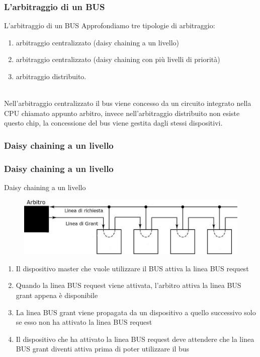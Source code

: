\begin{frame}
	\frametitle{L'arbitraggio di un BUS}
	  
	\begin{block}{L'arbitraggio di un BUS}
		Approfondiamo tre tipologie di arbitraggio:
		\begin{enumerate}
			\item arbitraggio centralizzato (daisy chaining a un livello)
			\item arbitraggio centralizzato (daisy chaining con più livelli di priorità)
			\item arbitraggio distribuito.
		\end{enumerate}
		~\\
		Nell'arbitraggio centralizzato il bus viene concesso da un circuito integrato nella CPU chiamato appunto arbitro, invece nell'arbitraggio distribuito non esiste questo chip, la concessione del bus viene gestita dagli stessi dispositivi.

	\end{block}
\end{frame}



\subsubsection[Daisy chaining a un livello]{Daisy chaining a un livello}
\begin{frame}
	\frametitle{Daisy chaining a un livello}
	  
	\begin{block}{Daisy chaining a un livello}
		\begin{figure}[!htbp]
			\centering
			\includegraphics[width=0.8\linewidth]{images/6_bus/daisy_chaining_lev_1.jpg}
		\end{figure}
		\begin{footnotesize}
		\begin{enumerate}
			\item Il dispositivo master che vuole utilizzare il BUS attiva la linea BUS request
			\item Quando la linea BUS request viene attivata, l'arbitro attiva la linea BUS grant appena è disponibile
			\item La linea BUS grant viene propagata da un dispositivo a quello successivo solo se esso non ha attivato la linea BUS request
			\item Il dispositivo che ha attivato la linea BUS request deve attendere che la linea BUS grant diventi attiva prima di poter utilizzare il bus
		\end{enumerate}
		\end{footnotesize}
	\end{block}
\end{frame}


